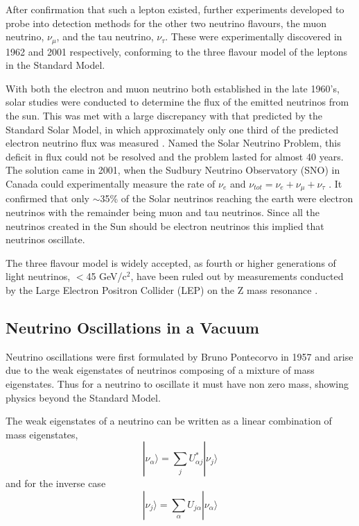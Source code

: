 After confirmation that such a lepton existed, further experiments developed to probe into detection methods for the other two neutrino flavours, the muon neutrino, $\nu_{\mu}$, and the tau neutrino, $\nu_{\tau}$. These were experimentally discovered in 1962 \cite{NuMu} and 2001 \cite{NuTau} respectively, conforming to the three flavour model of the leptons in the Standard Model. 

With both the electron and muon neutrino both established in the late 1960's, solar studies were conducted to determine the flux of the emitted neutrinos from the sun. This was met with a large discrepancy with that predicted by the Standard Solar Model, in which approximately only one third of the predicted electron neutrino flux was measured \cite{Solar}. Named the Solar Neutrino Problem, this deficit in flux could not be resolved and the problem lasted for almost 40 years. The solution came in 2001, when the Sudbury Neutrino Observatory (SNO) in Canada could experimentally measure the rate of $\nu_{e}$ and $\nu_{tot} = \nu_{e} + \nu_{\mu} + \nu_{\tau}$ \cite{NuSolar}. It confirmed that only $\sim$35\% of the Solar neutrinos reaching the earth were electron neutrinos with the remainder being muon and tau neutrinos. Since all the neutrinos created in the Sun should be electron neutrinos this implied that neutrinos oscillate.

The three flavour model is widely accepted, as fourth or higher generations of light neutrinos,  $<$45 GeV/c$^{2}$, have been ruled out by measurements conducted by the Large Electron Positron Collider (LEP) on the Z mass resonance \cite{ZMassResonance}. 

\subsection{Neutrino Oscillations in a Vacuum}
Neutrino oscillations were first formulated by Bruno Pontecorvo in 1957 \cite{Bruno} and arise due to the weak eigenstates of neutrinos composing of a mixture of mass eigenstates. Thus for a neutrino to oscillate it must have non zero mass, showing physics beyond the Standard Model.

The weak eigenstates of a neutrino can be written as a linear combination of mass eigenstates, 
\begin{equation}
|\nu_{\alpha}\rangle = \sum_{j}U_{\alpha j}^{\ast}|\nu_{j}\rangle 
\end{equation}
and for the inverse case
\begin{equation}
|\nu_{j}\rangle = \sum_{\alpha}U_{j \alpha}|\nu_{\alpha}\rangle
\label{eq:nuInverse}
\end{equation}

